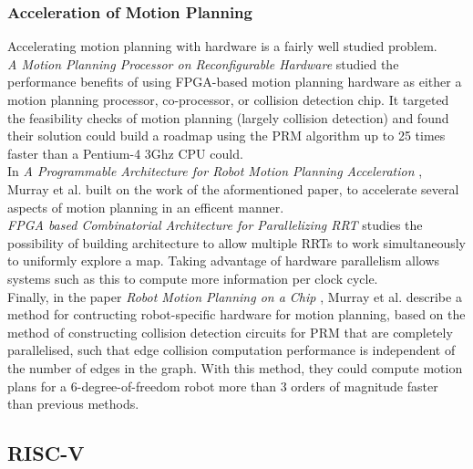     \subsubsection*{Acceleration of Motion Planning}
        Accelerating motion planning with hardware is a fairly well studied problem. \\
        \textit{A Motion Planning Processor on Reconfigurable Hardware} \cite{Atay2006} studied the performance benefits of using \gls{FPGA}-based motion planning hardware as either a motion planning processor, co-processor, or collision detection chip. It targeted the feasibility checks of motion planning (largely collision detection) and found their solution could build a roadmap using the \gls{PRM} algorithm up to 25 times faster than a Pentium-4 3Ghz CPU could. \\
        In \textit{A Programmable Architecture for Robot Motion Planning Acceleration} \cite{Murray}, Murray et al. built on the work of the aformentioned paper, to accelerate several aspects of motion planning in an efficent manner. \\
        \textit{FPGA based Combinatorial Architecture for Parallelizing RRT} \cite{Malik2015} studies the possibility of building architecture to allow multiple \gls{RRT}s to work simultaneously to uniformly explore a map. Taking advantage of hardware parallelism allows systems such as this to compute more information per clock cycle. \\
        Finally, in the paper \textit{Robot Motion Planning on a Chip} \cite{Murrayb}, Murray et al. describe a method for contructing robot-specific hardware for motion planning, based on the method of constructing collision detection circuits for \gls{PRM} that are completely parallelised, such that edge collision computation performance is independent of the number of edges in the graph. With this method, they could compute motion plans for a 6-degree-of-freedom robot more than 3 orders of magnitude faster than previous methods.

    \subsection{RISC-V}
